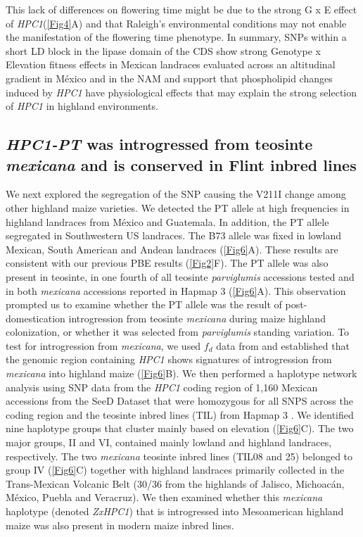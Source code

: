 \documentclass[9pt,twocolumn,twoside,lineno]{biorxiv}
\newcommand{\mex}{\textit{mexicana}\xspace}
\newcommand{\hpc}{\textit{HPC1}\xspace}
\newcommand{\parv}{\textit{parviglumis}\xspace}
\begin{document}
This lack of differences on flowering time might be due to the strong G x E effect of \hpc (\cref{Fig4}A) and that Raleigh's environmental conditions may not enable the manifestation of the flowering time phenotype.
In summary, SNPs within a short LD block in the lipase domain of the  CDS show strong Genotype x Elevation fitness effects in Mexican landraces evaluated across an altitudinal gradient in M\'exico and in the NAM and support that phospholipid changes induced by \hpc have physiological effects that may explain the strong selection of \hpc in highland environments.

\subsection{\textit{HPC1-PT} was introgressed from teosinte \mex and is conserved in Flint inbred lines}
We next explored the segregation of the SNP causing the V211I change among other highland maize varieties.
We detected the PT allele at high frequencies in highland landraces from M\'exico and Guatemala. 
In addition, the PT allele segregated in Southwestern US landraces. 
The B73 allele was fixed in lowland Mexican, South American and Andean landraces (\cref{Fig6}A). 
These results are consistent with our previous PBE results (\cref{Fig2}F).
The PT allele was also present in teosinte, in one fourth of all teosinte \parv accessions tested and in both \mex accessions reported in Hapmap 3 \cite{Bukowski2017-ng} (\cref{Fig6}A). 
This observation prompted us to examine whether the PT allele was the result of post-domestication introgression from teosinte \mex during maize highland colonization, or whether it was selected from \parv standing variation.
To test for introgression from \mex, we used \(f_d\) data from \cite{Gonzalez-Segovia2019-jy} and established that the genomic region containing \hpc shows signatures of introgression from \mex into highland maize (\cref{Fig6}B).
We then performed a haplotype network analysis using SNP data from the \hpc coding region of 1,160 Mexican accessions from the SeeD Dataset \cite{Romero_Navarro2017-cn} that were homozygous for all SNPS across the coding region and the teosinte inbred lines (TIL) from Hapmap 3 \cite{Bukowski2017-ng}.   
We identified nine haplotype groups that cluster mainly based on elevation (\cref{Fig6}C). 
The two major groups, II and VI, contained mainly lowland and highland landraces, respectively. 
The two \mex teosinte inbred lines (TIL08 and 25) belonged to group IV  (\cref{Fig6}C) together with highland landraces primarily collected in the Trans-Mexican Volcanic Belt (30/36 from the highlands of Jalisco, Michoacán, M\'exico, Puebla and Veracruz).
We then examined whether this \mex haplotype (denoted \textit{ZxHPC1}) that is introgressed into Mesoamerican highland maize was also present in modern maize inbred lines. 
\end{document}
